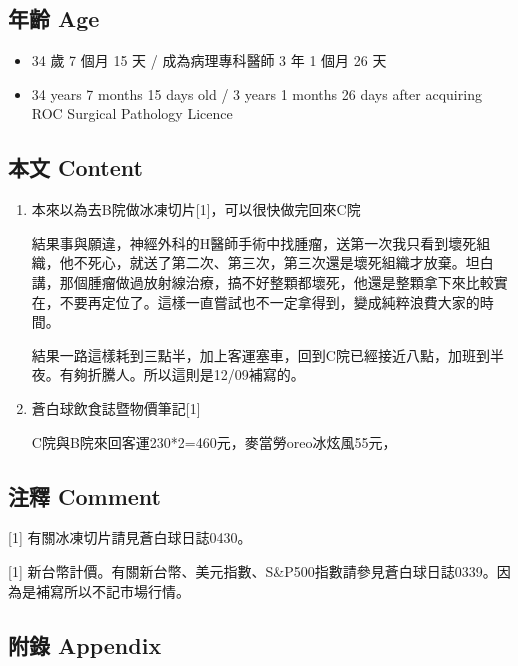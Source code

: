 \documentclass[a5paper, 11pt
]{book}
\providecommand{\tightlist}{%
  \setlength{\itemsep}{0pt}\setlength{\parskip}{0pt}}
\begin{document}
\hypertarget{ux5e74ux9f61-age-7}{%
\subsection{年齡 Age}\label{ux5e74ux9f61-age-7}}

\begin{itemize}
\tightlist
\item
  34 歲 7 個月 15 天 / 成為病理專科醫師 3 年 1 個月 26 天
\item
  34 years 7 months 15 days old / 3 years 1 months 26 days after
  acquiring ROC Surgical Pathology Licence
\end{itemize}

\hypertarget{ux672cux6587-content-7}{%
\subsection{本文 Content}\label{ux672cux6587-content-7}}

\begin{enumerate}
\def\labelenumi{\arabic{enumi}.}
\item
  本來以為去B院做冰凍切片{[}1{]}，可以很快做完回來C院

  結果事與願違，神經外科的H醫師手術中找腫瘤，送第一次我只看到壞死組織，他不死心，就送了第二次、第三次，第三次還是壞死組織才放棄。坦白講，那個腫瘤做過放射線治療，搞不好整顆都壞死，他還是整顆拿下來比較實在，不要再定位了。這樣一直嘗試也不一定拿得到，變成純粹浪費大家的時間。

  結果一路這樣耗到三點半，加上客運塞車，回到C院已經接近八點，加班到半夜。有夠折騰人。所以這則是12/09補寫的。
\item
  蒼白球飲食誌暨物價筆記{[}1{]}

  C院與B院來回客運230*2=460元，麥當勞oreo冰炫風55元，
\end{enumerate}

\hypertarget{ux6ce8ux91cb-comment-7}{%
\subsection{注釋 Comment}\label{ux6ce8ux91cb-comment-7}}

{[}1{]} 有關冰凍切片請見蒼白球日誌0430。

{[}1{]}
新台幣計價。有關新台幣、美元指數、S\&P500指數請參見蒼白球日誌0339。因為是補寫所以不記市場行情。

\hypertarget{ux9644ux9304-appendix-7}{%
\subsection{附錄 Appendix}\label{ux9644ux9304-appendix-7}}
\end{document}
